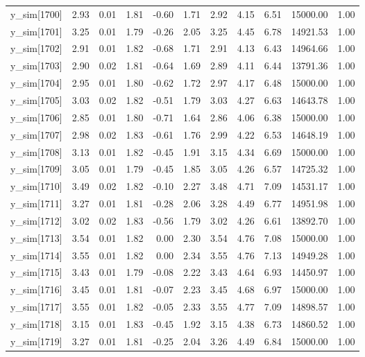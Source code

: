 \begin{table}[ht]
\begin{tabular}{rrrrrrrrrrr}
  y\_sim[1700] & 2.93 & 0.01 & 1.81 & -0.60 & 1.71 & 2.92 & 4.15 & 6.51 & 15000.00 & 1.00 \\ 
  y\_sim[1701] & 3.25 & 0.01 & 1.79 & -0.26 & 2.05 & 3.25 & 4.45 & 6.78 & 14921.53 & 1.00 \\ 
  y\_sim[1702] & 2.91 & 0.01 & 1.82 & -0.68 & 1.71 & 2.91 & 4.13 & 6.43 & 14964.66 & 1.00 \\ 
  y\_sim[1703] & 2.90 & 0.02 & 1.81 & -0.64 & 1.69 & 2.89 & 4.11 & 6.44 & 13791.36 & 1.00 \\ 
  y\_sim[1704] & 2.95 & 0.01 & 1.80 & -0.62 & 1.72 & 2.97 & 4.17 & 6.48 & 15000.00 & 1.00 \\ 
  y\_sim[1705] & 3.03 & 0.02 & 1.82 & -0.51 & 1.79 & 3.03 & 4.27 & 6.63 & 14643.78 & 1.00 \\ 
  y\_sim[1706] & 2.85 & 0.01 & 1.80 & -0.71 & 1.64 & 2.86 & 4.06 & 6.38 & 15000.00 & 1.00 \\ 
  y\_sim[1707] & 2.98 & 0.02 & 1.83 & -0.61 & 1.76 & 2.99 & 4.22 & 6.53 & 14648.19 & 1.00 \\ 
  y\_sim[1708] & 3.13 & 0.01 & 1.82 & -0.45 & 1.91 & 3.15 & 4.34 & 6.69 & 15000.00 & 1.00 \\ 
  y\_sim[1709] & 3.05 & 0.01 & 1.79 & -0.45 & 1.85 & 3.05 & 4.26 & 6.57 & 14725.32 & 1.00 \\ 
  y\_sim[1710] & 3.49 & 0.02 & 1.82 & -0.10 & 2.27 & 3.48 & 4.71 & 7.09 & 14531.17 & 1.00 \\ 
  y\_sim[1711] & 3.27 & 0.01 & 1.81 & -0.28 & 2.06 & 3.28 & 4.49 & 6.77 & 14951.98 & 1.00 \\ 
  y\_sim[1712] & 3.02 & 0.02 & 1.83 & -0.56 & 1.79 & 3.02 & 4.26 & 6.61 & 13892.70 & 1.00 \\ 
  y\_sim[1713] & 3.54 & 0.01 & 1.82 & 0.00 & 2.30 & 3.54 & 4.76 & 7.08 & 15000.00 & 1.00 \\ 
  y\_sim[1714] & 3.55 & 0.01 & 1.82 & 0.00 & 2.34 & 3.55 & 4.76 & 7.13 & 14949.28 & 1.00 \\ 
  y\_sim[1715] & 3.43 & 0.01 & 1.79 & -0.08 & 2.22 & 3.43 & 4.64 & 6.93 & 14450.97 & 1.00 \\ 
  y\_sim[1716] & 3.45 & 0.01 & 1.81 & -0.07 & 2.23 & 3.45 & 4.68 & 6.97 & 15000.00 & 1.00 \\ 
  y\_sim[1717] & 3.55 & 0.01 & 1.82 & -0.05 & 2.33 & 3.55 & 4.77 & 7.09 & 14898.57 & 1.00 \\ 
  y\_sim[1718] & 3.15 & 0.01 & 1.83 & -0.45 & 1.92 & 3.15 & 4.38 & 6.73 & 14860.52 & 1.00 \\ 
  y\_sim[1719] & 3.27 & 0.01 & 1.81 & -0.25 & 2.04 & 3.26 & 4.49 & 6.84 & 15000.00 & 1.00 \\ 

\end{tabular}
\end{table}
